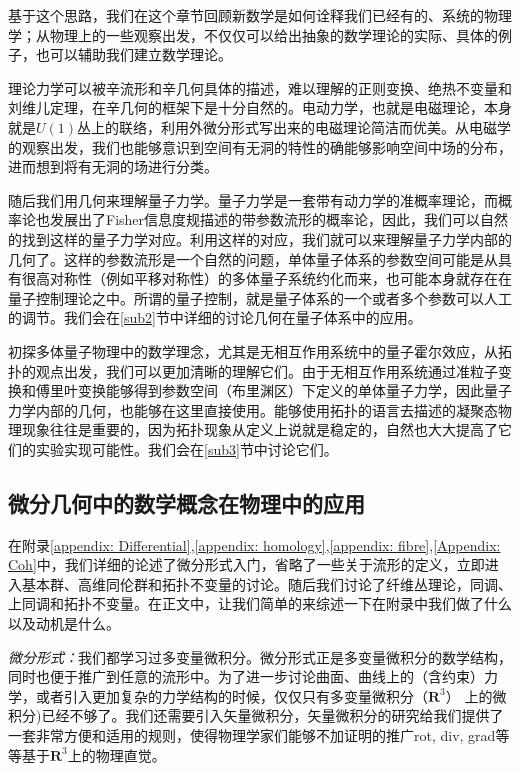 \documentclass[supercite]{HustGraduPaper}
\begin{document}
	基于这个思路，我们在这个章节回顾新数学是如何诠释我们已经有的、系统的物理学；从物理上的一些观察出发，不仅仅可以给出抽象的数学理论的实际、具体的例子，也可以辅助我们建立数学理论。
	
	
	
	理论力学可以被辛流形和辛几何具体的描述，难以理解的正则变换、绝热不变量和刘维儿定理，在辛几何的框架下是十分自然的。电动力学，也就是电磁理论，本身就是$U(1)$丛上的联络，利用外微分形式写出来的电磁理论简洁而优美。从电磁学的观察出发，我们也能够意识到空间有无洞的特性的确能够影响空间中场的分布，进而想到将有无洞的场进行分类。
	
	随后我们用几何来理解量子力学。量子力学是一套带有动力学的准概率理论，而概率论也发展出了Fisher信息度规描述的带参数流形的概率论，因此，我们可以自然的找到这样的量子力学对应。利用这样的对应，我们就可以来理解量子力学内部的几何了。这样的参数流形是一个自然的问题，单体量子体系的参数空间可能是从具有很高对称性（例如平移对称性）的多体量子系统约化而来，也可能本身就存在在量子控制理论之中。所谓的量子控制，就是量子体系的一个或者多个参数可以人工的调节。我们会在\ref{sub2}节中详细的讨论几何在量子体系中的应用。
	
	初探多体量子物理中的数学理念，尤其是无相互作用系统中的量子霍尔效应，从拓扑的观点出发，我们可以更加清晰的理解它们。由于无相互作用系统通过准粒子变换和傅里叶变换能够得到参数空间（布里渊区）下定义的单体量子力学，因此量子力学内部的几何，也能够在这里直接使用。能够使用拓扑的语言去描述的凝聚态物理现象往往是重要的，因为拓扑现象从定义上说就是稳定的，自然也大大提高了它们的实验实现可能性。我们会在\ref{sub3}节中讨论它们。
	
	\subsection{微分几何中的数学概念在物理中的应用 \label{sub1}}
	在附录\ref{appendix: Differential},\ref{appendix: homology},\ref{appendix: fibre},\ref{Appendix: Coh}中，我们详细的论述了微分形式入门，省略了一些关于流形的定义，立即进入基本群、高维同伦群和拓扑不变量的讨论。随后我们讨论了纤维丛理论，同调、上同调和拓扑不变量\cite{省身2001微分几何讲义,扬政1998物理学中的几何方法,梁灿彬2006微分几何入门与广义相对论,frankel2011geometry}。在正文中，让我们简单的来综述一下在附录中我们做了什么以及动机是什么。
	
	\textit{微分形式：}我们都学习过多变量微积分。微分形式正是多变量微积分的数学结构，同时也便于推广到任意的流形中。为了进一步讨论曲面、曲线上的（含约束）力学，或者引入更加复杂的力学结构的时候，仅仅只有多变量微积分（$\mathbf{R}^3$） 上的微积分)已经不够了。我们还需要引入矢量微积分，矢量微积分的研究给我们提供了一套非常方便和适用的规则，使得物理学家们能够不加证明的推广rot, div, grad等等基于$\mathbf{R}^3$上的物理直觉。
	
\end{document}
